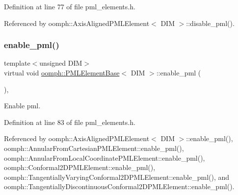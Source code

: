 Definition at line 77 of file pml\+\_\+elements.\+h.



Referenced by oomph\+::\+Axis\+Aligned\+P\+M\+L\+Element$<$ D\+I\+M $>$\+::disable\+\_\+pml().

\mbox{\label{classoomph_1_1PMLElementBase_a4eb9bdef561b94ba2e9b515bad6ccf57}} 
\subsubsection{\texorpdfstring{enable\+\_\+pml()}{enable\_pml()}}
{\footnotesize\ttfamily template$<$unsigned D\+IM$>$ \\
virtual void \hyperlink{classoomph_1_1PMLElementBase}{oomph\+::\+P\+M\+L\+Element\+Base}$<$ D\+IM $>$\+::enable\+\_\+pml (\begin{DoxyParamCaption}{ }\end{DoxyParamCaption})\hspace{0.3cm}{\ttfamily [inline]}, {\ttfamily [virtual]}}



Enable pml. 



Definition at line 83 of file pml\+\_\+elements.\+h.



Referenced by oomph\+::\+Axis\+Aligned\+P\+M\+L\+Element$<$ D\+I\+M $>$\+::enable\+\_\+pml(), oomph\+::\+Annular\+From\+Cartesian\+P\+M\+L\+Element\+::enable\+\_\+pml(), oomph\+::\+Annular\+From\+Local\+Coordinate\+P\+M\+L\+Element\+::enable\+\_\+pml(), oomph\+::\+Conformal2\+D\+P\+M\+L\+Element\+::enable\+\_\+pml(), oomph\+::\+Tangentially\+Varying\+Conformal2\+D\+P\+M\+L\+Element\+::enable\+\_\+pml(), and oomph\+::\+Tangentially\+Discontinuous\+Conformal2\+D\+P\+M\+L\+Element\+::enable\+\_\+pml().

\mbox{\label{classoomph_1_1PMLElementBase_a770d8de20d8ae2d55f5f006052a39b3f}} 
